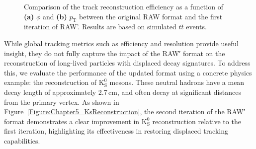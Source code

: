 \begin{figure}[h]
    \caption[Comparison of the track reconstruction efficiency as a function of $\phi$ and $p_\mathrm{T}$ between the original RAW format and the first iteration of RAW'.]{Comparison of the track reconstruction efficiency as a function of \textbf{(a)} $\phi$ and \textbf{(b)} $p_\mathrm{T}$ between the original RAW format and the first iteration of RAW'. Results are based on simulated $t\bar{t}$ events.} 
    \label{Figure:Chapter5_ResolutionComparison}
\end{figure}

While global tracking metrics such as efficiency and resolution provide useful insight, they do not fully capture the impact of the RAW′ format on the reconstruction of long-lived particles with displaced decay signatures. To address this, we evaluate the performance of the updated format using a concrete physics example: the reconstruction of $\mathrm{K}_\mathrm{S}^0$ mesons. These neutral hadrons have a mean decay length of approximately 2.7\,cm, and often decay at significant distances from the primary vertex. As shown in Figure~\ref{Figure:Chapter5_KsReconstruction}, the second iteration of the RAW′ format demonstrates a clear improvement in $\mathrm{K}_\mathrm{S}^0$ reconstruction relative to the first iteration, highlighting its effectiveness in restoring displaced tracking capabilities.

